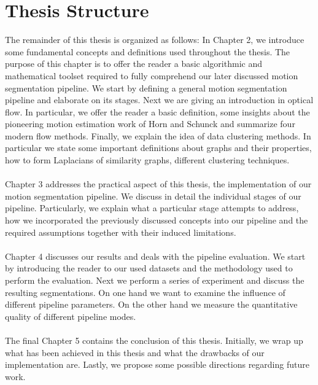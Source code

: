 \section{Thesis Structure}
The remainder of this thesis is organized as follows: In Chapter 2, we introduce some fundamental concepts and definitions used throughout the thesis. The purpose of this chapter is to offer the reader a basic algorithmic and mathematical toolset required to fully comprehend our later discussed motion segmentation pipeline. We start by defining a general motion segmentation pipeline and elaborate on its stages. Next we are giving an introduction in optical flow. In particular, we offer the reader a basic definition, some insights about the pioneering motion estimation work of Horn and Schunck and summarize four modern flow methods. Finally, we explain the idea of data clustering methods. In particular we state some important definitions about graphs and their properties, how to form Laplacians of similarity graphs, different clustering techniques. \\ \\
Chapter 3 addresses the practical aspect of this thesis, the implementation of our motion segmentation pipeline. We discuss in detail the individual stages of our pipeline. Particularly, we explain what a particular stage attempts to address, how we incorporated the previously discussed concepts into our pipeline and the required assumptions together with their induced limitations. \\ \\
Chapter 4 discusses our results and deals with the pipeline evaluation. We start by introducing the reader to our used datasets and the methodology used to perform the evaluation. Next we perform a series of experiment and discuss the resulting segmentations. On one hand we want to examine the influence of different pipeline parameters. On the other hand we measure the quantitative quality of different pipeline modes. \\ \\
The final Chapter 5 contains the conclusion of this thesis. Initially, we wrap up what has been achieved in this thesis and what the drawbacks of our implementation are. Lastly, we propose some possible directions regarding future work.